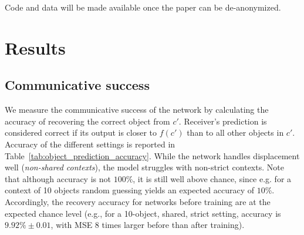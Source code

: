 \documentclass[11pt,a4paper]{article}
\newcommand{\nbEC}[1]{{\leavevmode\color{blue}{\scriptsize#1}}}
\begin{document}
Code and data will be made available once the paper can be de-anonymized. 

\section{Results}

\subsection{Communicative success}

We measure the communicative success of the network by calculating the accuracy of recovering the correct object from $c'$. Receiver's prediction is considered correct if its output is closer to $f(c')$ than to all other objects in $c'$. Accuracy of the different settings is reported in Table~\ref{tab:object_prediction_accuracy}. While the network handles displacement well (\textit{non-shared contexts}), the model struggles with non-strict contexts. Note that although accuracy is not $100\%$, it is still well above chance, since e.g. for a context of 10 objects random guessing yields an expected accuracy of $10\%$. 
Accordingly, the recovery accuracy for networks before training are at the expected chance level (e.g., for a 10-object, shared, strict setting, accuracy is $9.92\%\pm 0.01$, with MSE 8 times larger before than after training).

\end{document}

